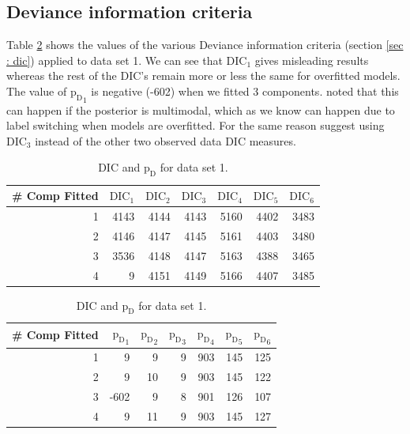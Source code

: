 \subsection{Deviance information criteria}
Table \ref{table : ds_simple_dic} shows the values of the various Deviance information criteria (section \ref{sec : dic}) applied to data set 1. We can see that $\text{DIC}_1$ gives misleading results whereas the rest of the DIC's remain more or less the same for overfitted models. The value of ${\text{p}_\text{D}}_1$ is negative (-602) when we fitted 3 components. \citet[pg. 161]{lunn_bugs_2012} noted that this can happen if the posterior is multimodal, which as we know can happen due to label switching when models are overfitted. For the same reason \citet{celeux_deviance_2006} suggest using $\text{DIC}_3$ instead of the other two observed data DIC measures.

\begin{table}[!htb]
\centering
\caption{DIC and $\text{p}_\text{D}$ for data set 1.}
\label{table : ds_simple_dic} 
\begin{tabular}{@{}rrrrrrr@{}}
\toprule
\# Comp Fitted & $\text{DIC}_1$ & $\text{DIC}_2$  & $\text{DIC}_3$  & $\text{DIC}_4$  & $\text{DIC}_5$  & $\text{DIC}_6$  \\ \midrule
1      & 4143 & 4144 & 4143 & 5160 & 4402 & 3483 \\
2      & 4146 & 4147 & 4145 & 5161 & 4403 & 3480 \\
3      & 3536 & 4148 & 4147 & 5163 & 4388 & 3465 \\
4      & 9    & 4151 & 4149 & 5166 & 4407 & 3485 \\ \bottomrule
\end{tabular}

\begin{tabular}{@{}rrrrrrr@{}}
\toprule
\# Comp Fitted & ${\text{p}_\text{D}}_1$ & ${\text{p}_\text{D}}_2$ & ${\text{p}_\text{D}}_3$ & ${\text{p}_\text{D}}_4$ & ${\text{p}_\text{D}}_5$ & ${\text{p}_\text{D}}_6$ \\ \midrule
1      & 9    & 9    & 9    & 903  & 145  & 125  \\
2      & 9    & 10   & 9    & 903  & 145  & 122  \\
3      & -602 & 9    & 8    & 901  & 126  & 107  \\
4      & 9    & 11   & 9    & 903  & 145  & 127  \\ \bottomrule
\end{tabular}
\end{table}


